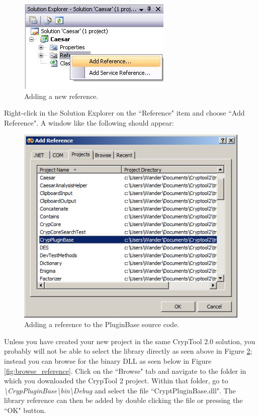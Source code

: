 \begin{figure}[h!]
	\includegraphics{figures/add_reference.jpg}
	\caption{Adding a new reference.}
	\label{fig:add_reference}
\end{figure}

\noindent Right-click in the Solution Explorer on the ``Reference" item and choose ``Add Reference". A window like the following should appear:

\begin{figure}[h!]
	\centering
		\includegraphics{figures/add_pluginbase_source.jpg}
	\caption{Adding a reference to the PluginBase source code.}
	\label{fig:add_pluginbase_source}
\end{figure}
\clearpage

\noindent Unless you have created your new project in the same CrypTool 2.0 solution, you probably will not be able to select the library directly as seen above in Figure \ref{fig:add_pluginbase_source}; instead you can browse for the binary DLL as seen below in Figure \ref{fig:browse_reference}. Click on the ``Browse" tab and navigate to the folder in which you downloaded the CrypTool 2 project. Within that folder, go to \textit{\textbackslash CrypPluginBase\textbackslash bin\textbackslash Debug} and select the file ``CryptPluginBase.dll". The library reference can then be added by double clicking the file or pressing the ``OK" button.


